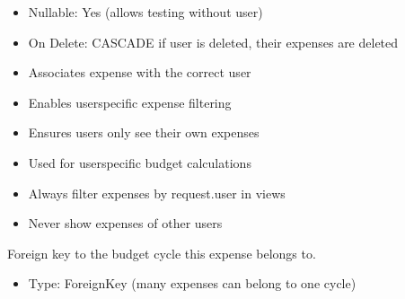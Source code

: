 \documentclass[letterpaper,10pt,english]{sphinxmanual}
\begin{document}
\begin{fulllineitems}
\begin{fulllineitems}
\begin{description}
\begin{itemize}
\item {} 
\sphinxAtStartPar
Nullable: Yes (allows testing without user)

\item {} 
\sphinxAtStartPar
On Delete: CASCADE \sphinxhyphen{} if user is deleted, their expenses are deleted

\end{itemize}

\begin{itemize}
\item {} 
\sphinxAtStartPar
Associates expense with the correct user

\item {} 
\sphinxAtStartPar
Enables user\sphinxhyphen{}specific expense filtering

\item {} 
\sphinxAtStartPar
Ensures users only see their own expenses

\item {} 
\sphinxAtStartPar
Used for user\sphinxhyphen{}specific budget calculations

\end{itemize}

\begin{itemize}
\item {} 
\sphinxAtStartPar
Always filter expenses by request.user in views

\item {} 
\sphinxAtStartPar
Never show expenses of other users

\end{itemize}

\end{description}

\end{fulllineitems}


\begin{fulllineitems}
\label{\detokenize{expensesApp:id14}}
\pysigstartsignatures
\pysigline
{}
\pysigstopsignatures
\sphinxAtStartPar
Foreign key to the budget cycle this expense belongs to.
\begin{description}
\begin{itemize}
\item {} 
\sphinxAtStartPar
Type: ForeignKey (many expenses can belong to one cycle)


\end{itemize}
\end{description}
\end{fulllineitems}
\end{fulllineitems}
\end{document}
